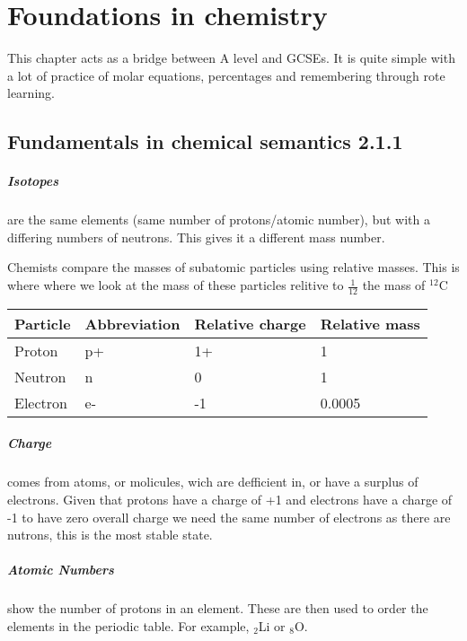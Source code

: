 \chapter{Foundations in chemistry}
    This chapter acts as a bridge between A level and GCSEs. It is quite       simple with a lot of practice of molar equations, percentages and           remembering through rote learning.
    

\section{Fundamentals in chemical semantics 2.1.1}
	\paragraph{Isotopes} are the same elements (same number of protons/atomic number), but with a differing numbers of neutrons. This gives it a different mass number.
      
	Chemists compare the masses of subatomic particles using relative masses.
	This is where where we look at the mass of these particles relitive to $\frac{1}{12}$ the mass of $^12$C
	
\begin{tabular}{ |p{3cm}||p{3cm}|p{3cm}|p{3cm}|  }
 \hline
 Particle    & Abbreviation &Relative charge&Relative mass\\
 \hline
 Proton   & p+    &1+&   1\\
 Neutron& n  & 0   &1\\
 Electron& e-  & -1& 0.0005\\
 \hline
\end{tabular}

\paragraph{Charge} comes from atoms, or molicules, wich are defficient in, or have a surplus of electrons.
Given that protons have a charge of +1 and electrons have a charge of -1 to have zero overall charge we need the same number of electrons as there are nutrons, this is the most stable state.

\paragraph{Atomic Numbers}show the number of protons in an element. These are then used to order the elements in the periodic table. For example, $_{2}$Li or $_{8}$O.

